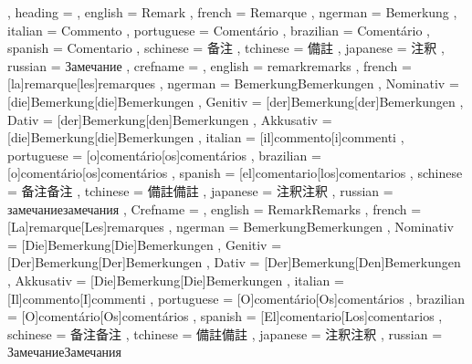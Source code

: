   {
    , heading =   {
                    , english     = Remark
                    , french      = Remarque
                    , ngerman     = Bemerkung
                    , italian     = Commento
                    , portuguese  = Comentário
                    , brazilian   = Comentário
                    , spanish     = Comentario
                    , schinese    = 备注
                    , tchinese    = 備註
                    , japanese    = 注釈
                    , russian     = Замечание
                  }
    , crefname =  {
                    , english     = {remark}{remarks}
                    , french      = [la]{remarque}[les]{remarques}
                    , ngerman     = { {Bemerkung}{Bemerkungen}
                                      , Nominativ = [die]{Bemerkung}[die]{Bemerkungen}
                                      , Genitiv   = [der]{Bemerkung}[der]{Bemerkungen}
                                      , Dativ     = [der]{Bemerkung}[den]{Bemerkungen}
                                      , Akkusativ = [die]{Bemerkung}[die]{Bemerkungen}
                                    }
                    , italian     = [il]{commento}[i]{commenti}
                    , portuguese  = [o]{comentário}[os]{comentários}
                    , brazilian   = [o]{comentário}[os]{comentários}
                    , spanish     = [el]{comentario}[los]{comentarios}
                    , schinese    = {备注}{备注}
                    , tchinese    = {備註}{備註}
                    , japanese    = {注釈}{注釈}
                    , russian     = {замечание}{замечания}
                  }
    , Crefname =  {
                    , english     = {Remark}{Remarks}
                    , french      = [La]{remarque}[Les]{remarques}
                    , ngerman     = { {Bemerkung}{Bemerkungen}
                                      , Nominativ = [Die]{Bemerkung}[Die]{Bemerkungen}
                                      , Genitiv   = [Der]{Bemerkung}[Der]{Bemerkungen}
                                      , Dativ     = [Der]{Bemerkung}[Den]{Bemerkungen}
                                      , Akkusativ = [Die]{Bemerkung}[Die]{Bemerkungen}
                                    }
                    , italian     = [Il]{commento}[I]{commenti}
                    , portuguese  = [O]{comentário}[Os]{comentários}
                    , brazilian   = [O]{comentário}[Os]{comentários}
                    , spanish     = [El]{comentario}[Los]{comentarios}
                    , schinese    = {备注}{备注}
                    , tchinese    = {備註}{備註}
                    , japanese    = {注釈}{注釈}
                    , russian     = {Замечание}{Замечания}
                  }
  }

